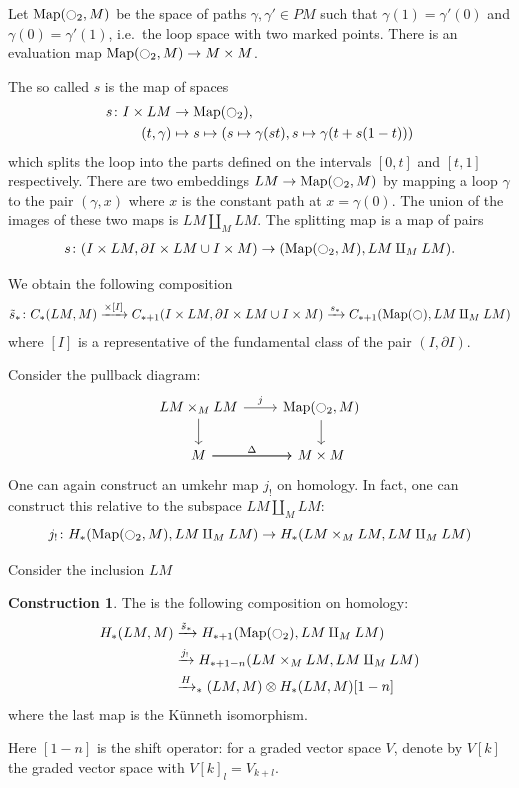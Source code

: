 \documentclass{scrartcl}
\let\emph\relax
\theoremstyle{plain}
\theoremstyle{definition}
\newtheorem{construction}[theorem]{Construction}
\newcommand{\union}{\mathbin{\cup}}
\let\xto\xrightarrow
\DeclareMathOperator{\Map}{Map}
\renewcommand{\coprod}{\mathbin{\amalg}}
\begin{document}
Let $\Map(\ocircle_2, M)$ be the space of paths $\gamma, \gamma'\in PM$ such that $\gamma(1) = \gamma'(0)$ and $\gamma(0) = \gamma'(1)$, i.e.\ the loop space with two marked points. There is an evaluation map $\Map(\ocircle_2, M)\to M\times M$.

The so called \emph{splitting map} $s$ is the map of spaces 
\begin{align*}
    s\colon I\times LM & \to\Map(\ocircle_2),\\
    (t, \gamma) &\mapsto s\mapsto (s\mapsto \gamma(st), s\mapsto \gamma(t + s(1-t)))
\end{align*}
which splits the loop into the parts defined on the intervals $[0, t]$ and $[t, 1]$ respectively. There are two embeddings $LM\to \Map(\ocircle_2, M)$ by mapping a loop $\gamma$ to the pair $(\gamma, x)$ where $x$ is the constant path at $x=\gamma(0)$. The union of the images of these two maps is $LM\coprod_M LM$. The splitting map is a map of pairs
\begin{align*}
    s\colon (I\times LM, \partial I\times LM \union I\times M) \to (\Map(\ocircle_2, M), LM\coprod_M LM).
\end{align*} 

We obtain the following composition
\begin{align*}
    \tilde s_*\colon C_*(LM, M) \xto{\times [I]} C_{*+1}(I\times LM, \partial I\times LM\union I\times M) \xto{s_*} C_{*+1}(\Map(\ocircle), LM\coprod_M LM)
\end{align*}
where $[I]$ is a representative of the fundamental class of the pair $(I, \partial I)$.

Consider the pullback diagram:
\[\begin{tikzcd}
    LM\times_M LM \dar \rar["j"] &  \Map(\ocircle_2, M) \dar \\
    M \rar["\Delta"] \rar & M\times M
\end{tikzcd}\]
One can again construct an umkehr map $j_!$ on homology. In fact, one can construct this relative to the subspace $LM\coprod_M LM$:
$$ j_!\colon H_*(\Map(\ocircle_2, M), LM\coprod_M LM) \to H_*(LM\times_M LM, LM\coprod_M LM)$$

Consider the inclusion $LM $
\begin{construction} 
    The \emph{Loop Coproduct} is the following composition on homology:
    \begin{align*}
        H_*(LM, M) &\xto{\tilde s_*} H_{*+1}(\Map(\ocircle_2), LM\coprod_M LM) \\ &\xto{j_!} H_{*+1-n}(LM\times_M LM, LM\coprod_M LM) \\ &\xto H_{*}(LM, M)\otimes H_*(LM, M)[1-n]
    \end{align*}
    where the last map is the Künneth isomorphism.
\end{construction}
Here $[1-n]$ is the shift operator: for a graded vector space $V$, denote by $V[k]$ the graded vector space with $V[k]_l = V_{k+l}$.
\end{document}
